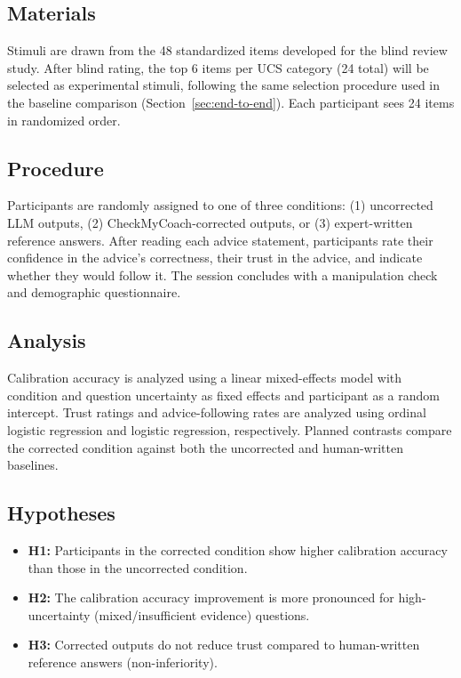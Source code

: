 \documentclass[manuscript, review, anonymous]{acmart}
\begin{document}
\subsection{Materials}

Stimuli are drawn from the 48 standardized items developed for the blind review study. After blind rating, the top 6 items per UCS category (24 total) will be selected as experimental stimuli, following the same selection procedure used in the baseline comparison (Section~\ref{sec:end-to-end}). Each participant sees 24 items in randomized order.

\subsection{Procedure}

Participants are randomly assigned to one of three conditions: (1) uncorrected LLM outputs, (2) CheckMyCoach-corrected outputs, or (3) expert-written reference answers. After reading each advice statement, participants rate their confidence in the advice's correctness, their trust in the advice, and indicate whether they would follow it. The session concludes with a manipulation check and demographic questionnaire.

\subsection{Analysis}

Calibration accuracy is analyzed using a linear mixed-effects model with condition and question uncertainty as fixed effects and participant as a random intercept. Trust ratings and advice-following rates are analyzed using ordinal logistic regression and logistic regression, respectively. Planned contrasts compare the corrected condition against both the uncorrected and human-written baselines.

\subsection{Hypotheses}

\begin{itemize}
    \item \textbf{H1:} Participants in the corrected condition show higher calibration accuracy than those in the uncorrected condition.
    \item \textbf{H2:} The calibration accuracy improvement is more pronounced for high-uncertainty (mixed/insufficient evidence) questions.
    \item \textbf{H3:} Corrected outputs do not reduce trust compared to human-written reference answers (non-inferiority).
\end{itemize}
\end{document}
